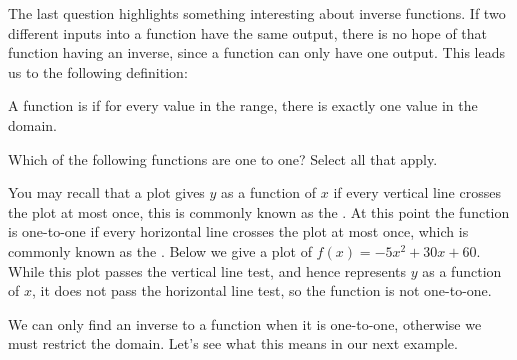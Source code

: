\documentclass{ximera}
\begin{document}
The last question highlights something interesting about inverse functions.  If two different inputs into a function have the same output, there is no hope  of that function having an inverse, since a function can only have one output.  This leads us to the following definition:

\begin{definition}
A function is  if for every value in the range,
there is exactly one value in the domain.
\end{definition}


\begin{question}
Which of the following functions are one to one?  Select all that
apply.
\begin{selectAll}
\end{selectAll}
\end{question}

You may recall that a plot gives $y$ as a function of $x$ if every
vertical line crosses the plot at most once, this is commonly known as
the . At this point the function is one-to-one
if every horizontal line crosses the plot at most once, which is
commonly known as the . Below we give a plot
of $f(x)=-5x^2+30x+60$. While this plot passes the vertical line test,
and hence represents $y$ as a function of $x$, it does not pass the
horizontal line test, so the function is not one-to-one.
\begin{image}
\end{image}


We can only find an inverse to a function when it is one-to-one,
otherwise we must restrict the domain. Let's see what this means in
our next example.
\end{document}
